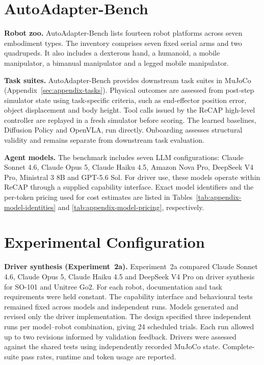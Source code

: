 \section[AutoAdapter-Bench]{AutoAdapter-Bench}

\noindent\textbf{Robot zoo.} AutoAdapter-Bench lists fourteen robot platforms
across seven embodiment types. The
inventory comprises seven fixed serial arms and two quadrupeds. It also
includes a dexterous hand, a humanoid, a mobile manipulator, a bimanual
manipulator and a legged mobile manipulator.

\noindent\textbf{Task suites.} AutoAdapter-Bench provides downstream task suites
in MuJoCo (Appendix~\ref{sec:appendix-tasks}). Physical outcomes are assessed
from post-step simulator state using
task-specific criteria, such as end-effector position error, object displacement
and body height.
Tool calls issued by the ReCAP high-level controller are replayed in a fresh
simulator before scoring. The learned baselines, Diffusion Policy and OpenVLA,
run directly. Onboarding assesses structural validity and remains separate
from downstream task evaluation.

\noindent\textbf{Agent models.} The benchmark includes seven LLM configurations:
Claude Sonnet 4.6, Claude Opus 5, Claude Haiku 4.5, Amazon Nova Pro,
DeepSeek V4 Pro, Ministral 3 8B and GPT-5.6 Sol. For driver use, these models
operate within ReCAP through a supplied capability interface. Exact model
identifiers and the per-token pricing used for cost estimates are listed in
Tables~\ref{tab:appendix-model-identities} and
\ref{tab:appendix-model-pricing}, respectively.

\section[Experimental Configuration]{Experimental Configuration}
\label{sec:benchmark-experiment-design}

\noindent\textbf{Driver synthesis (Experiment~2a).} Experiment~2a compared
Claude Sonnet 4.6, Claude Opus 5, Claude Haiku 4.5 and DeepSeek V4 Pro on
driver synthesis for SO-101 and Unitree Go2. For each robot, documentation
and task requirements were held constant. The capability interface and
behavioural tests remained fixed across models and independent runs.
Models generated and revised only the driver implementation. The design
specified three independent runs per model--robot combination, giving
24 scheduled trials. Each run allowed up to two revisions informed by
validation feedback. Drivers were assessed against the shared tests using
independently recorded MuJoCo state. Complete-suite pass rates, runtime and
token usage are reported.

